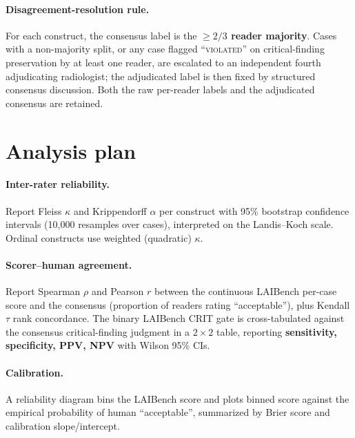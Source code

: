 \documentclass[11pt]{article}
\begin{document}
\paragraph{Disagreement-resolution rule.} For each construct, the consensus label is the \textbf{$\geq 2/3$ reader majority}. Cases with a non-majority split, or any case flagged ``\textsc{violated}'' on critical-finding preservation by at least one reader, are escalated to an independent fourth adjudicating radiologist; the adjudicated label is then fixed by structured consensus discussion. Both the raw per-reader labels and the adjudicated consensus are retained.

\section{Analysis plan}

\paragraph{Inter-rater reliability.} Report Fleiss $\kappa$ and Krippendorff $\alpha$ per construct with 95\% bootstrap confidence intervals (10{,}000 resamples over cases), interpreted on the Landis--Koch scale. Ordinal constructs use weighted (quadratic) $\kappa$.

\paragraph{Scorer--human agreement.} Report Spearman $\rho$ and Pearson $r$ between the continuous LAIBench per-case score and the consensus (proportion of readers rating ``acceptable''), plus Kendall $\tau$ rank concordance. The binary LAIBench CRIT gate is cross-tabulated against the consensus critical-finding judgment in a $2\times2$ table, reporting \textbf{sensitivity, specificity, PPV, NPV} with Wilson 95\% CIs.

\paragraph{Calibration.} A reliability diagram bins the LAIBench score and plots binned score against the empirical probability of human ``acceptable'', summarized by Brier score and calibration slope/intercept.
\end{document}
